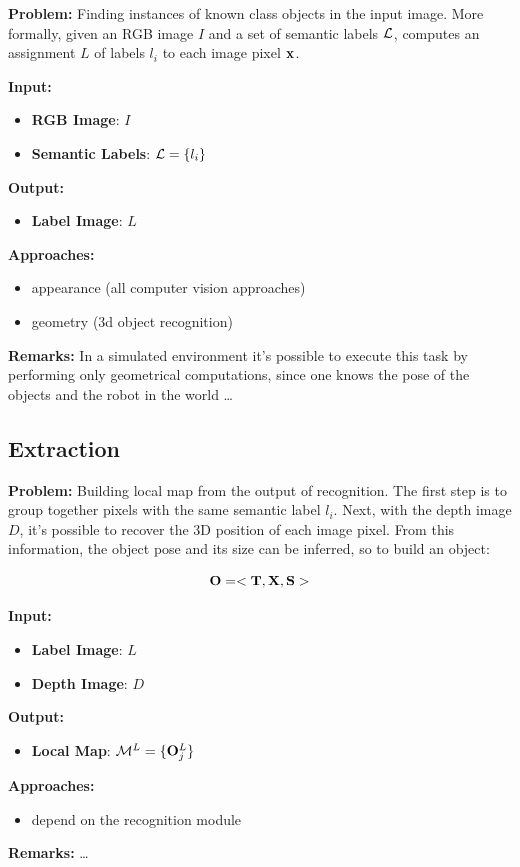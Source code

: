 \documentclass{article}
\begin{document}
	{\bf Problem: } Finding instances of known class objects in the input image. More formally, given an RGB image $I$ and a set of semantic labels $\mathcal{L}$, computes an assignment $L$ of labels $l_i$ to each image pixel $\mathbf{x}$.
	
	\noindent
	{\bf Input: }
	\begin{itemize}
		\item {\bf RGB Image}: $I$
		\item {\bf Semantic Labels}: $\mathcal{L} = \{l_i\}$
	\end{itemize}
	\noindent
	{\bf Output: }
	\begin{itemize}
		\item {\bf Label Image}: $L$
	\end{itemize}
	\noindent
	{\bf Approaches: }
	\begin{itemize}
		\item appearance (all computer vision approaches)
		\item geometry (3d object recognition)
	\end{itemize}
	\noindent
	{\bf Remarks: } In a simulated environment it's possible to execute this task by performing only geometrical computations, since one knows the pose of the objects and the robot in the world \dots
	
	\subsection{Extraction}
	
	{\bf Problem: } Building local map from the output of recognition. The first step is to group together pixels with the same semantic label $l_i$. Next, with the depth image $D$, it's possible to recover the 3D position of each image pixel. From this information, the object pose and its size can be inferred, so to build an object:
	
	\begin{equation}
	 \mathbf{O} = < \mathbf{T}, \mathbf{X}, \mathbf{S} > 
	\end{equation}
	
	\noindent
	{\bf Input: }
	\begin{itemize}
		\item {\bf Label Image}: $L$
		\item {\bf Depth Image}: $D$
	\end{itemize}
	\noindent
	{\bf Output: }
	\begin{itemize}
		\item {\bf Local Map}: $\mathcal{M}^L = \{ \mathbf{O}_j^L \}$
	\end{itemize}
	\noindent
	{\bf Approaches: }
	\begin{itemize}
		\item depend on the recognition module
	\end{itemize}
	\noindent
	{\bf Remarks: } \dots
	
\end{document}
